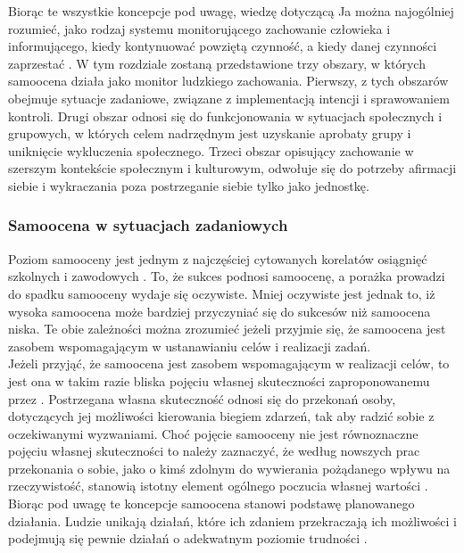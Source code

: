 \documentclass[man]{apa6}
\begin{document}
Biorąc te wszystkie koncepcje pod uwagę, wiedzę dotyczącą Ja można najogólniej rozumieć, jako rodzaj systemu monitorującego zachowanie człowieka  i informującego, kiedy kontynuować powziętą czynność, a kiedy danej czynności zaprzestać \parencite{higgins1996self}. W tym rozdziale zostaną przedstawione trzy obszary, w których samoocena działa jako monitor ludzkiego zachowania. Pierwszy, z tych obszarów obejmuje sytuacje zadaniowe, związane z implementacją intencji i sprawowaniem kontroli. Drugi obszar odnosi się do funkcjonowania w sytuacjach społecznych i grupowych, w których celem nadrzędnym jest uzyskanie aprobaty grupy i uniknięcie wykluczenia społecznego. Trzeci obszar opisujący zachowanie w szerszym kontekście społecznym i kulturowym, odwołuje się do potrzeby afirmacji siebie i wykraczania poza postrzeganie siebie tylko jako jednostkę.\\

\subsubsection{Samoocena w sytuacjach zadaniowych}

Poziom samooceny jest jednym z najczęściej cytowanych korelatów osiągnięć szkolnych \parencite{hansford1982relationship, davies1999reading} i zawodowych \parencite{judge2001relationship}. To, że sukces podnosi samoocenę, a porażka prowadzi do spadku samooceny wydaje się oczywiste. Mniej oczywiste jest jednak to, iż wysoka samoocena może bardziej przyczyniać się do sukcesów niż samoocena niska. Te obie zależności można zrozumieć jeżeli przyjmie się, że samoocena jest zasobem wspomagającym w ustanawianiu celów i realizacji zadań.\\

Jeżeli przyjąć, że samoocena jest zasobem wspomagającym w realizacji celów, to jest ona w takim razie bliska pojęciu własnej skuteczności zaproponowanemu przez \textcite{bandura1977self}. Postrzegana własna skuteczność odnosi się do przekonań osoby, dotyczących jej możliwości kierowania biegiem zdarzeń, tak aby radzić sobie z oczekiwanymi wyzwaniami. Choć pojęcie samooceny nie jest równoznaczne pojęciu własnej skuteczności to należy zaznaczyć, że według nowszych prac przekonania o sobie, jako o kimś zdolnym do wywierania pożądanego wpływu na rzeczywistość, stanowią istotny element ogólnego poczucia własnej wartości \parencite{tafarodi2001two}.\\

Biorąc pod uwagę te koncepcje samoocena stanowi podstawę planowanego działania. Ludzie unikają działań, które ich zdaniem przekraczają ich możliwości i podejmują się pewnie działań o adekwatnym poziomie trudności \parencite{bandura1977self}.
\end{document}
